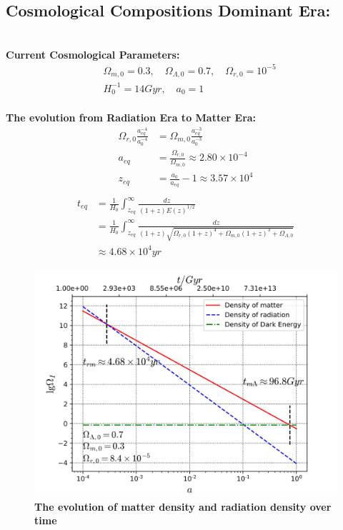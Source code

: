 \documentclass[14pt]{article}
\begin{document}
\subsection{Cosmological Compositions Dominant Era:}

\quad\\
\textbf{Current Cosmological Parameters:}
\begin{align*}
    &\Omega_{m,0}=0.3,\quad \Omega_{\Lambda,0}=0.7,\quad \Omega_{r,0}=10^{-5}\\
    &H^{-1}_{0}=14Gyr,\quad a_{0}=1\tag{1.5.1}
\end{align*}
\quad\\
\textbf{The evolution from Radiation Era to Matter Era:}
\begin{align*}
\Omega_{r,0}\displaystyle\frac{a^{-4}_{eq}}{a^{-4}_{0}}&=\Omega_{m,0}\displaystyle\frac{a^{-3}_{eq}}{a^{-3}_{0}}\tag{1.5.2}\\
a_{eq}&=\frac{\Omega_{r,0}}{\Omega_{m,0}} \approx 2.80\times 10^{-4} \tag{1.5.3}\\
z_{eq}&=\frac{a_{0}}{a_{eq}}-1 \approx 3.57 \times 10^{4}\tag{1.5.4}\\
\end{align*}
\begin{align*}
  t_{eq}&=\frac{1}{H_{0}}\int^{\infty}_{z_{eq}}\displaystyle\frac{dz}{(1+z)E(z)^{1/2}}\\
      &=\frac{1}{H_{0}}\int^{\infty}_{z_{eq}}\displaystyle\frac{dz}{(1+z)\sqrt{\Omega_{r,0}(1+z)^{4}+\Omega_{m,0}(1+z)^{3}+\Omega_{\Lambda,0}}}\\
      &\approx 4.68\times 10^{4}yr  \tag{1.5.5}
\end{align*}
\begin{figure}[H]
\centering
\includegraphics[scale=1]{R2M_Eralog.png}
\caption{\textbf{The evolution of matter density and radiation density over time}}
\end{figure}
\end{document}
